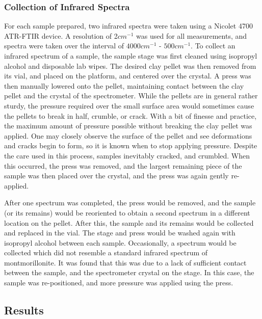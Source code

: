 \subsubsection{Collection of Infrared Spectra}
For each sample prepared, two infrared spectra were taken using a Nicolet 4700 ATR-FTIR device. A resolution of 2$cm^{-1}$ was used for all measurements, and spectra were taken over the interval of $4000cm^{-1}$ - $500cm^{-1}$. To collect an infrared spectrum of a sample, the sample stage was first cleaned using isopropyl alcohol and disposable lab wipes. The desired clay pellet was then removed from its vial, and placed on the platform, and centered over the crystal. A press was then manually lowered onto the pellet, maintaining contact between the clay pellet and the crystal of the spectrometer. While the pellets are in general rather sturdy, the pressure required over the small surface area would sometimes cause the pellets to break in half, crumble, or crack. With a bit of finesse and practice, the maximum amount of pressure possible without breaking the clay pellet was applied. One may closely observe the surface of the pellet and see deformations and cracks begin to form, so it is known when to stop applying pressure. Despite the care used in this process, samples inevitably cracked, and crumbled. When this occurred, the press was removed, and the largest remaining piece of the sample was then placed over the crystal, and the press was again gently re-applied.

After one spectrum was completed, the press would be removed, and the sample (or its remains) would be reoriented to obtain a second spectrum in a different location on the pellet. After this, the sample and its remains would be collected and replaced in the vial. The stage and press would be washed again with isopropyl alcohol between each sample. Occasionally, a spectrum would be collected which did not resemble a standard infrared spectrum of montmorillonite. It was found that this was due to a lack of sufficient contact between the sample, and the spectrometer crystal on the stage. In this case, the sample was re-positioned, and more pressure was applied using the press.

\subsection{Results}


